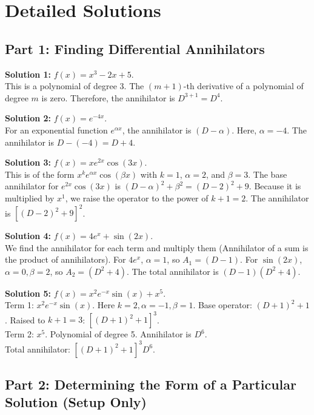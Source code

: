 \documentclass[11pt]{article}
\begin{document}
\newpage

\section{Detailed Solutions}

\subsection*{Part 1: Finding Differential Annihilators}

\textbf{Solution 1:} $f(x) = x^3 - 2x + 5$. \\
This is a polynomial of degree 3. The $(m+1)$-th derivative of a polynomial of degree $m$ is zero. Therefore, the annihilator is $D^{3+1} = D^4$.

\textbf{Solution 2:} $f(x) = e^{-4x}$. \\
For an exponential function $e^{\alpha x}$, the annihilator is $(D - \alpha)$. Here, $\alpha = -4$. The annihilator is $D - (-4) = D + 4$.

\textbf{Solution 3:} $f(x) = x e^{2x} \cos(3x)$. \\
This is of the form $x^k e^{\alpha x} \cos(\beta x)$ with $k=1$, $\alpha=2$, and $\beta=3$. The base annihilator for $e^{2x} \cos(3x)$ is $(D - \alpha)^2 + \beta^2 = (D - 2)^2 + 9$. Because it is multiplied by $x^1$, we raise the operator to the power of $k+1 = 2$. The annihilator is $[(D - 2)^2 + 9]^2$.

\textbf{Solution 4:} $f(x) = 4e^{x} + \sin(2x)$. \\
We find the annihilator for each term and multiply them (Annihilator of a sum is the product of annihilators). For $4e^x$, $\alpha=1$, so $A_1 = (D - 1)$. For $\sin(2x)$, $\alpha=0, \beta=2$, so $A_2 = (D^2 + 4)$. The total annihilator is $(D - 1)(D^2 + 4)$.

\textbf{Solution 5:} $f(x) = x^2 e^{-x} \sin(x) + x^5$. \\
Term 1: $x^2 e^{-x} \sin(x)$. Here $k=2, \alpha=-1, \beta=1$. Base operator: $(D+1)^2 + 1$. Raised to $k+1=3$: $[(D+1)^2 + 1]^3$. \\
Term 2: $x^5$. Polynomial of degree 5. Annihilator is $D^6$. \\
Total annihilator: $[(D+1)^2 + 1]^3 D^6$.

\subsection*{Part 2: Determining the Form of a Particular Solution (Setup Only)}
\end{document}
